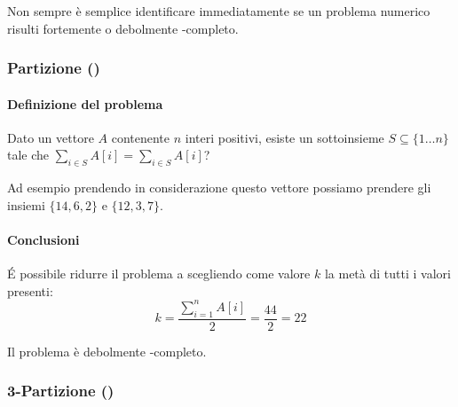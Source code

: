 \begin{note}
Non sempre è semplice identificare immediatamente se un problema numerico risulti fortemente o debolmente \NP-completo.
\end{note}

\subsubsection{Partizione (\partition)}

\paragraph{Definizione del problema}
Dato un vettore \(A\) contenente \(n\) interi positivi, esiste un sottoinsieme \(S \subseteq \{1 \dots n\}\) tale che \(\sum_{i \in S} A[i] = \sum_{i \in S} A[i]\)?

\begin{figure}[H]
	\centering
\end{figure}

Ad esempio prendendo in considerazione questo vettore possiamo prendere gli insiemi \(\{14, 6, 2\}\) e \(\{12, 3, 7\}\).

\paragraph{Conclusioni}
\'{E} possibile ridurre il problema {\partition} a {\subSetSumProblem} scegliendo come valore \(k\) la metà di tutti i valori presenti:
\[
	k = \frac{\sum_{i=1}^{n} A[i]}{2} = \frac{44}{2} = 22
\]

\begin{note}
Il problema {\partition} è debolmente \NP-completo.
\end{note}

\subsubsection{3-Partizione (\treePartition)}

